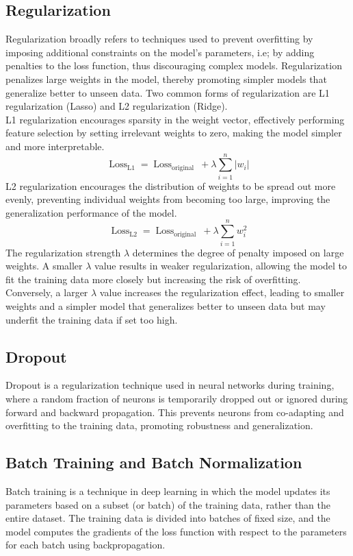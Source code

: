 \subsection{Regularization}
Regularization broadly refers to techniques used to prevent overfitting by imposing additional constraints on the model's parameters, i.e; by adding penalties to the loss function, thus discouraging complex models. Regularization penalizes large weights in the model, thereby promoting simpler models that generalize better to unseen data. Two common forms of regularization are L1 regularization (Lasso) and L2 regularization (Ridge). \\
L1 regularization encourages sparsity in the weight vector, effectively performing feature selection by setting irrelevant weights to zero, making the model simpler and more interpretable. 
\[ \operatorname{Loss}_{\mathrm{L} 1}=\operatorname{Loss}_{\text {original }}+\lambda \sum_{i=1}^n\left|w_i\right| \]
L2 regularization encourages the distribution of weights to be spread out more evenly, preventing individual weights from becoming too large, improving the generalization performance of the model.
\[ \operatorname{Loss}_{\mathrm{L} 2}=\operatorname{Loss}_{\text {original }}+\lambda \sum_{i=1}^n w^2_i \]
The regularization strength $\lambda$ determines the degree of penalty imposed on large weights. A smaller $\lambda$ value results in weaker regularization, allowing the model to fit the training data more closely but increasing the risk of overfitting. Conversely, a larger $\lambda$ value increases the regularization effect, leading to smaller weights and a simpler model that generalizes better to unseen data but may underfit the training data if set too high.
\subsection{Dropout}
Dropout is a regularization technique used in neural networks during training, where a random fraction of neurons is temporarily dropped out or ignored during forward and backward propagation. This prevents neurons from co-adapting and overfitting to the training data, promoting robustness and generalization.
\subsection{Batch Training and Batch Normalization}
Batch training is a technique in deep learning in which the model updates its parameters based on a subset (or batch) of the training data, rather than the entire dataset. The training data is divided into batches of fixed size, and the model computes the gradients of the loss function with respect to the parameters for each batch using backpropagation. 
